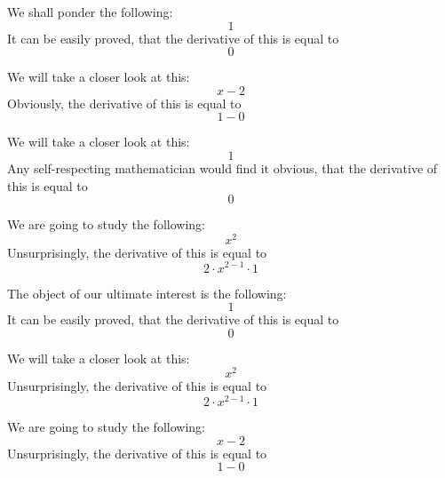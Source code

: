 \documentclass{article}
\begin{document}
We shall ponder the following:
\begin{equation}
1 
\end{equation}
It can be easily proved, that the derivative of this is equal to
\begin{equation}
0 
\end{equation}

We will take a closer look at this:
\begin{equation}
x - 2 
\end{equation}
Obviously, the derivative of this is equal to
\begin{equation}
1 - 0 
\end{equation}

We will take a closer look at this:
\begin{equation}
1 
\end{equation}
Any self-respecting mathematician would find it obvious, that the derivative of this is equal to
\begin{equation}
0 
\end{equation}

We are going to study the following:
\begin{equation}
x ^{2 } 
\end{equation}
Unsurprisingly, the derivative of this is equal to
\begin{equation}
2 \cdot x ^{2 - 1 } \cdot 1 
\end{equation}

The object of our ultimate interest is the following:
\begin{equation}
1 
\end{equation}
It can be easily proved, that the derivative of this is equal to
\begin{equation}
0 
\end{equation}

We will take a closer look at this:
\begin{equation}
x ^{2 } 
\end{equation}
Unsurprisingly, the derivative of this is equal to
\begin{equation}
2 \cdot x ^{2 - 1 } \cdot 1 
\end{equation}

We are going to study the following:
\begin{equation}
x - 2 
\end{equation}
Unsurprisingly, the derivative of this is equal to
\begin{equation}
1 - 0 
\end{equation}
\end{document}
